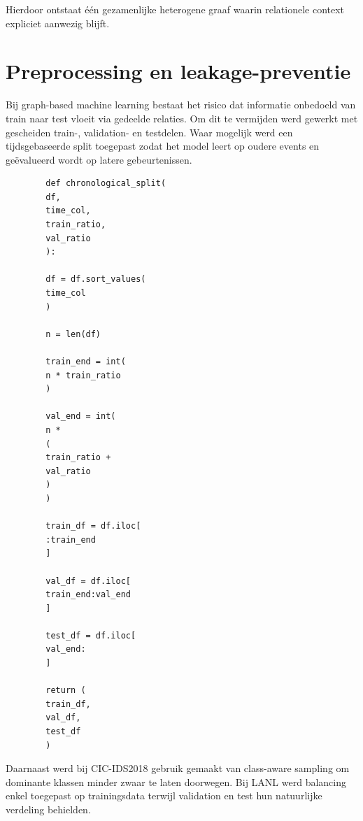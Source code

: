 Hierdoor ontstaat één gezamenlijke heterogene graaf waarin relationele context expliciet aanwezig blijft.

\section{Preprocessing en leakage-preventie}

Bij graph-based machine learning bestaat het risico dat informatie onbedoeld van train naar test vloeit via gedeelde relaties.
\newline
\newline
Om dit te vermijden werd gewerkt met gescheiden train-, validation- en testdelen.
\newline
\newline
Waar mogelijk werd een tijdsgebaseerde split toegepast zodat het model leert op oudere events en geëvalueerd wordt op latere gebeurtenissen.

\begin{listing}[H]
    \begin{verbatim}
        def chronological_split(
        df,
        time_col,
        train_ratio,
        val_ratio
        ):
        
        df = df.sort_values(
        time_col
        )
        
        n = len(df)
        
        train_end = int(
        n * train_ratio
        )
        
        val_end = int(
        n *
        (
        train_ratio +
        val_ratio
        )
        )
        
        train_df = df.iloc[
        :train_end
        ]
        
        val_df = df.iloc[
        train_end:val_end
        ]
        
        test_df = df.iloc[
        val_end:
        ]
        
        return (
        train_df,
        val_df,
        test_df
        )
    \end{verbatim}
    
    \caption[Tijdsgebaseerde datasplit]
    {Opsplitsing van events in train-, validation- en testdata.}
    
    \label{code:chronological-split}
\end{listing}

Daarnaast werd bij CIC-IDS2018 gebruik gemaakt van class-aware sampling om dominante klassen minder zwaar te laten doorwegen.
\newline
\newline
Bij LANL werd balancing enkel toegepast op trainingsdata terwijl validation en test hun natuurlijke verdeling behielden.


